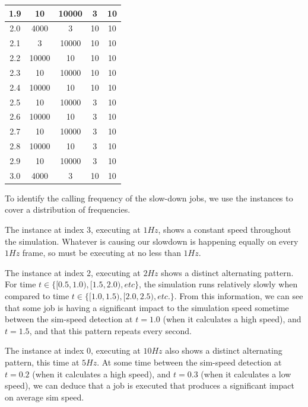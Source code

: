 \documentclass[11pt,fleqn]{report}
\begin{document}
\begin{center}
\begin{tabular}{|c|c|c|c|c|}
1.9  &    10   & 10000  &  3  &  10   \\ \hline
2.0  &  4000   &     3  & 10  &  10   \\ \hline
2.1  &     3   & 10000  & 10  &  10   \\ \hline
2.2  & 10000   &    10  & 10  &  10   \\ \hline
2.3  &    10   & 10000  & 10  &  10   \\ \hline
2.4  & 10000   &    10  & 10  &  10   \\ \hline
2.5  &    10   & 10000  &  3  &  10   \\ \hline
2.6  & 10000   &    10  &  3  &  10   \\ \hline
2.7  &    10   & 10000  &  3  &  10   \\ \hline
2.8  & 10000   &    10  &  3  &  10   \\ \hline
2.9  &    10   & 10000  &  3  &  10   \\ \hline
3.0  &  4000   &     3  & 10  &  10   \\ \hline
\end{tabular}
\end{center}


To identify the calling frequency of the slow-down jobs, we use the instances to
cover a distribution of frequencies.

The instance at index 3, executing at $1 Hz$, shows a
constant speed throughout the simulation. Whatever is causing our slowdown is
happening equally on every $1 Hz$ frame, so must be executing at no less than
$1 Hz$.

The instance at index 2, executing at $2 Hz$ shows a distinct alternating
pattern.  For time \newline $t \in \{[0.5, 1.0), [1.5, 2.0), etc\}$, the
simulation runs relatively slowly when compared to time\newline
$t \in \{[1.0, 1.5), [2.0, 2.5), etc.\}$.
From this information, we can see that some job is having a significant impact
to the simulation speed sometime between the sim-speed detection at $t=1.0$
(when it calculates a high speed), and $t=1.5$, and that this pattern repeats
every second.

The instance at index 0, executing at $10 Hz$ also shows a distinct alternating
pattern, this time at $5 Hz$. At some time between the sim-speed detection at
$t=0.2$
(when it calculates a high speed), and $t=0.3$ (when it calculates a low speed),
we can deduce that a job is executed that produces a significant impact
on average sim speed.
\end{document}
